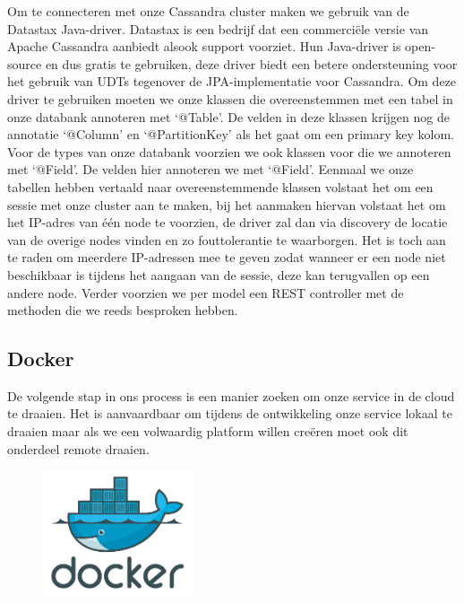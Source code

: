 \documentclass{article}
\begin{document}
\par
Om te connecteren met onze Cassandra cluster maken we gebruik van de Datastax Java-driver. Datastax is een bedrijf dat een commerciële versie van Apache Cassandra aanbiedt alsook support voorziet. Hun Java-driver is open-source en dus gratis te gebruiken, deze driver biedt een betere ondersteuning voor het gebruik van UDTs tegenover de JPA-implementatie voor Cassandra. Om deze driver te gebruiken moeten we onze klassen die overeenstemmen met een tabel in onze databank annoteren met ‘@Table’. De velden in deze klassen krijgen nog de annotatie ‘@Column’ en ‘@PartitionKey’ als het gaat om een primary key kolom. Voor de types van onze databank voorzien we ook klassen voor die we annoteren met ‘@Field’. De velden hier annoteren we met ‘@Field’. Eenmaal we onze tabellen hebben vertaald naar overeenstemmende klassen volstaat het om een sessie met onze cluster aan te maken, bij het aanmaken hiervan volstaat het om het IP-adres van \'e\'en node te voorzien, de driver zal dan via discovery de locatie van de overige nodes vinden en zo fouttolerantie te waarborgen. Het is toch aan te raden om meerdere IP-adressen mee te geven zodat wanneer er een node niet beschikbaar is tijdens het aangaan van de sessie, deze kan terugvallen op een andere node. Verder voorzien we per model een REST controller met de methoden die we reeds besproken hebben.
\par
	\subsection{Docker}
	De volgende stap in ons process is een manier zoeken om onze service in de cloud te draaien. Het is aanvaardbaar om tijdens de ontwikkeling onze service lokaal te draaien maar als we een volwaardig platform willen cre\"eren moet ook dit onderdeel remote draaien.
	\par
	\begin{figure}
  	\includegraphics[width=0.4\textwidth]{images/docker-logo.PNG}
	\end{figure}
	
\end{document}
